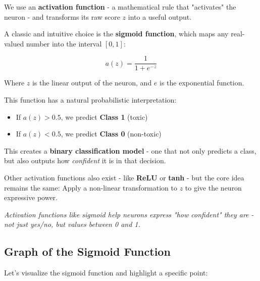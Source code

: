 \documentclass[11pt]{article}
\begin{document}
We use an \textbf{activation function} - a mathematical rule that "activates" the neuron - and transforms its raw score $z$ into a useful output.

\vspace{0.5em}

A classic and intuitive choice is the \textbf{sigmoid function}, which maps any real-valued number into the interval $[0, 1]$:

\[
a(z) = \frac{1}{1 + e^{-z}}
\]

Where $z$ is the linear output of the neuron, and $e$ is the exponential function.

\vspace{1em}

This function has a natural probabilistic interpretation:
\begin{itemize}
    \item If $a(z) > 0.5$, we predict \textbf{Class 1} (toxic)
    \item If $a(z) < 0.5$, we predict \textbf{Class 0} (non-toxic)
\end{itemize}

\vspace{0.5em}

This creates a \textbf{binary classification model} - one that not only predicts a class, but also outputs how \emph{confident} it is in that decision.

\vspace{1em}

Other activation functions also exist - like \textbf{ReLU} or \textbf{tanh} - but the core idea remains the same:  
Apply a non-linear transformation to $z$ to give the neuron expressive power.

\vspace{1em}

\begin{tcolorbox}[colback=gray!8, colframe=gray!40!black, sharp corners=southwest, boxrule=0.3mm]
\centering
\textit{Activation functions like sigmoid help neurons express "how confident" they are -}\\
\textit{not just yes/no, but values between 0 and 1.}
\end{tcolorbox}


\subsection*{Graph of the Sigmoid Function}

Let's visualize the sigmoid function and highlight a specific point:
\end{document}
